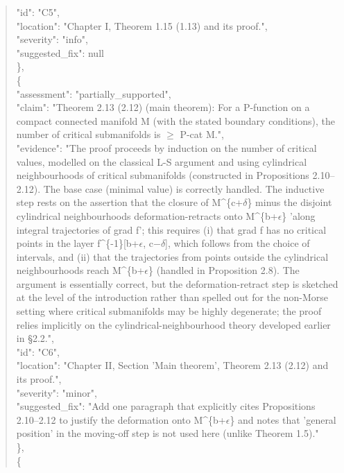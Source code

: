 \documentclass[11pt]{article}
\begin{document}
\begin{quote}
      "id": "C5",\\
      "location": "Chapter I, Theorem 1.15 (1.13) and its proof.",\\
      "severity": "info",\\
      "suggested\_fix": null\\
    \},\\
    \{\\
      "assessment": "partially\_supported",\\
      "claim": "Theorem 2.13 (2.12) (main theorem): For a P-function on a compact connected manifold M (with the stated boundary conditions), the number of critical submanifolds is \ensuremath{\ge} P-cat M.",\\
      "evidence": "The proof proceeds by induction on the number of critical values, modelled on the classical L-S argument and using cylindrical neighbourhoods of critical submanifolds (constructed in Propositions 2.10--2.12). The base case (minimal value) is correctly handled. The inductive step rests on the assertion that the closure of M\^{}\{c+\ensuremath{\delta}\} minus the disjoint cylindrical neighbourhoods deformation-retracts onto M\^{}\{b+\ensuremath{\epsilon}\} 'along integral trajectories of grad f'; this requires (i) that grad f has no critical points in the layer f\^{}\{-1\}[b+\ensuremath{\epsilon}, c\ensuremath{-}\ensuremath{\delta}], which follows from the choice of intervals, and (ii) that the trajectories from points outside the cylindrical neighbourhoods reach M\^{}\{b+\ensuremath{\epsilon}\} (handled in Proposition 2.8). The argument is essentially correct, but the deformation-retract step is sketched at the level of the introduction rather than spelled out for the non-Morse setting where critical submanifolds may be highly degenerate; the proof relies implicitly on the cylindrical-neighbourhood theory developed earlier in §2.2.",\\
      "id": "C6",\\
      "location": "Chapter II, Section 'Main theorem', Theorem 2.13 (2.12) and its proof.",\\
      "severity": "minor",\\
      "suggested\_fix": "Add one paragraph that explicitly cites Propositions 2.10--2.12 to justify the deformation onto M\^{}\{b+\ensuremath{\epsilon}\} and notes that 'general position' in the moving-off step is not used here (unlike Theorem 1.5)."\\
    \},\\
    \{\\

\end{quote}
\end{document}
